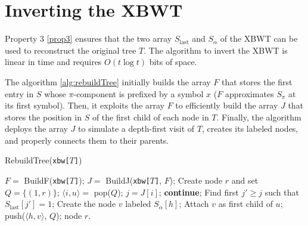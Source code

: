 \section{Inverting the XBWT}
Property 3 \ref{prop3} ensures that the two array $S_{\text{last}}$ and $S_{\alpha}$ of the XBWT can be used to reconstruct the original tree $T$. The algorithm to invert the XBWT is linear in time and requires $O(t \log t)$ bits of space.

The algorithm \ref{alg:rebuildTree} initially builds the array $F$ that stores the first entry in $S$ whose $\pi$-component is prefixed by a symbol $x$ ($F$ approximates $S_{\pi}$ at its first symbol). Then, it exploits the array $F$ to efficiently build the array $J$ that stores the position in $S$ of the first child of each node in $T$. Finally, the algorithm deploys the array $J$ to
simulate a depth-first visit of $T$, creates its labeled nodes, and properly connects them to their parents. 

\begin{algorithm}[H]
    \caption{RebuildTree(\texttt{xbw[$T$]})}
    \label{alg:rebuildTree}
    \begin{algorithmic}[1]
    \State $F = $ BuildF(\texttt{xbw[$T$]}); 
    \State $J = $ BuildJ(\texttt{xbw[$T$]}, $F$); 
    \State Create node $r$ and set $Q = \{(1, r)\}$; 
     
        \State $\langle i, u \rangle = $ pop($Q$);
        \State $j = J[i]$; 
         
            \State \textbf{continue};
        \EndIf
        \State Find first $j' \geq j$ such that $S_{\text{last}}[j'] = 1$; 
         
            \State Create the node $v$ labeled $S_\alpha[h]$;
            \State Attach $v$ as first child of $u$;
            \State push($\langle h, v \rangle$, $Q$);
        \EndFor
    \EndWhile
    \State \Return node $r$.
    \end{algorithmic}
\end{algorithm}

